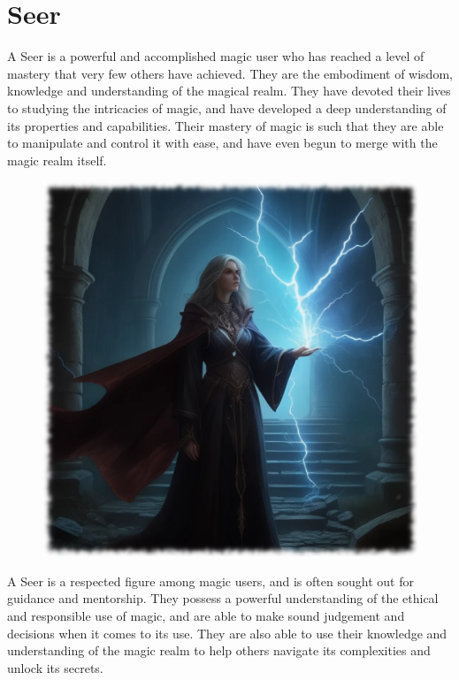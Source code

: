 \section{Seer}
A Seer is a powerful and accomplished magic user who has reached a level of mastery that very few others have achieved. They are the embodiment of wisdom, knowledge and understanding of the magical realm. They have devoted their lives to studying the intricacies of magic, and have developed a deep understanding of its properties and capabilities. Their mastery of magic is such that they are able to manipulate and control it with ease, and have even begun to merge with the magic realm itself.

\begin{figure}[h]
\begin{center}
\includegraphics[scale=0.23]{img/ai-images/elder-seer-lightning.png}
\end{center}
\end{figure}

A Seer is a respected figure among magic users, and is often sought out for guidance and mentorship. They possess a powerful understanding of the ethical and responsible use of magic, and are able to make sound judgement and decisions when it comes to its use. They are also able to use their knowledge and understanding of the magic realm to help others navigate its complexities and unlock its secrets.

